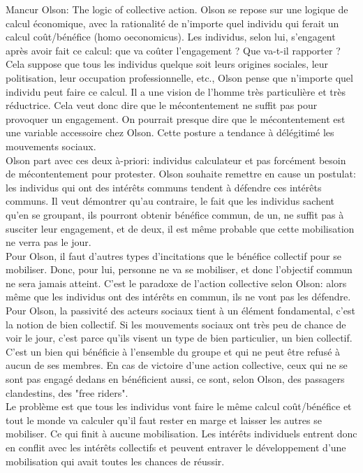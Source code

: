 \documentclass[10pt, a4paper, openany]{book}
\begin{document}
Mancur Olson: The logic of collective action. Olson se repose sur une logique de calcul économique, avec la rationalité de n'importe quel individu qui ferait un calcul coût/bénéfice (homo oeconomicus). Les individus, selon lui, s'engagent après avoir fait ce calcul: que va coûter l'engagement ? Que va-t-il rapporter ? \\
Cela suppose que tous les individus quelque soit leurs origines sociales, leur politisation, leur occupation professionnelle, etc., Olson pense que n'importe quel individu peut faire ce calcul. Il a une vision de l'homme très particulière et très réductrice. Cela veut donc dire que le mécontentement ne suffit pas pour provoquer un engagement. On pourrait presque dire que le mécontentement est une variable accessoire chez Olson. Cette posture a tendance à délégitimé les mouvements sociaux. \\
Olson part avec ces deux à-priori: individus calculateur et pas forcément besoin de mécontentement pour protester. Olson souhaite remettre en cause un postulat: les individus qui ont des intérêts communs tendent à défendre ces intérêts communs. Il veut démontrer qu'au contraire, le fait que les individus sachent qu'en se groupant, ils pourront obtenir bénéfice commun, de un, ne suffit pas à susciter leur engagement, et de deux, il est même probable que cette mobilisation ne verra pas le jour. \\
Pour Olson, il faut d'autres types d'incitations que le bénéfice collectif pour se mobiliser. Donc, pour lui, personne ne va se mobiliser, et donc l'objectif commun ne sera jamais atteint. C'est le paradoxe de l'action collective selon Olson: alors même que les individus ont des intérêts en commun, ils ne vont pas les défendre. \\
Pour Olson, la passivité des acteurs sociaux tient à un élément fondamental, c'est la notion de bien collectif. Si les mouvements sociaux ont très peu de chance de voir le jour, c'est parce qu'ils visent un type de bien particulier, un bien collectif. C'est un bien qui bénéficie à l'ensemble du groupe et qui ne peut être refusé à aucun de ses membres. En cas de victoire d'une action collective, ceux qui ne se sont pas engagé dedans en bénéficient aussi, ce sont, selon Olson, des passagers clandestins, des "free riders". \\
Le problème est que tous les individus vont faire le même calcul coût/bénéfice et tout le monde va calculer qu'il faut rester en marge et laisser les autres se mobiliser. Ce qui finit à aucune mobilisation. Les intérêts individuels entrent donc en conflit avec les intérêts collectifs et peuvent entraver le développement d'une mobilisation qui avait toutes les chances de réussir. \\
\end{document}
